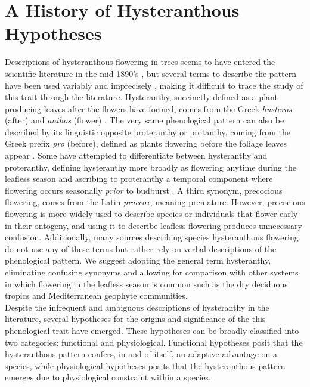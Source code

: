 \documentclass{article}\usepackage[]{graphicx}\usepackage[]{color}
\begin{document}
\section*{A History of Hysteranthous Hypotheses}
\indent Descriptions of hysteranthous flowering in trees seems to have entered the scientific literature in the mid 1890's \citep{Robertson1895}, but several terms to describe the pattern have been used variably and imprecisely \citep{Dyer1953}, making it difficult to trace the study of this trait through the literature. Hysteranthy, succinctly defined as a plant producing leaves after the flowers have formed, comes from the Greek \textit{husteros} (after) and \textit{anthos} (flower) \citep{Heinig1899}. The very same phenological pattern can also be described by its linguistic opposite proteranthy or protanthy, coming from the Greek prefix \textit{pro} (before), defined as plants flowering before the foliage leaves appear \citep{Heinig1899}. Some have attempted to differentiate between hysteranthy and proteranthy, defining hysteranthy more broadly as flowering anytime during the leafless season and ascribing to proteranthy a temporal component where flowering occurs seasonally \textit{prior} to budburst \citep{Lamont2011}.  A third synonym, precocious flowering, comes from the Latin \textit{praecox}, meaning premature\citep{Heinig1899}. However, precocious flowering is more widely used to describe species or individuals that flower early in their ontogeny\citep{Seleznyova2008,Pharis1965}, and using it to describe leafless flowering produces unnecessary confusion. Additionally, many sources describing species hysteranthous flowering do not use any of these terms but rather rely on verbal descriptions of the phenological pattern. We suggest adopting the general term hysteranthy, eliminating confusing synonyms and allowing for comparison with other systems in which flowering in the leafless season is common such as the dry deciduous tropics \cite{Franklin2016, other} and Mediterranean geophyte communities\citep{Marques2012}.\\
\indent Despite the infrequent and ambiguous descriptions of hysteranthy in the literature, several hypotheses for the origins and significance of the this phenological trait have emerged. These hypotheses can be broadly classified into two categories: functional and physiological. Functional hypotheses posit that the hysteranthous pattern confers, in and of itself, an adaptive advantage on a species, while physiological hypotheses posits that the hysteranthous pattern emerges due to physiological constraint within a species.\\
\end{document}
